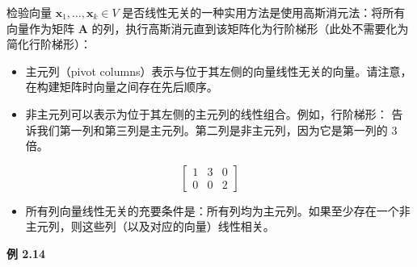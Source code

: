 检验向量 $ \boldsymbol{x}_1, \ldots, \boldsymbol{x}_k \in V $ 是否线性无关的一种实用方法是使用高斯消元法：将所有向量作为矩阵 $ \boldsymbol{A} $ 的列，执行高斯消元直到该矩阵化为行阶梯形（此处不需要化为简化行阶梯形）：

\begin{itemize}
\item 主元列（pivot columns）表示与位于其左侧的向量线性无关的向量。请注意，在构建矩阵时向量之间存在先后顺序。
\item 非主元列可以表示为位于其左侧的主元列的线性组合。例如，行阶梯形： 告诉我们第一列和第三列是主元列。第二列是非主元列，因为它是第一列的 3 倍。
\end{itemize}
\begin{equation}
\begin{bmatrix} 1 & 3 & 0 \\ 0 & 0 & 2 \end{bmatrix}
\tag{2.66}\label{eq:2-66}
\end{equation}
\begin{itemize}
\item 所有列向量线性无关的充要条件是：所有列均为主元列。如果至少存在一个非主元列，则这些列（以及对应的向量）线性相关。
\end{itemize}

\begin{notebox}
\textbf{例 2.14}
\end{notebox}

